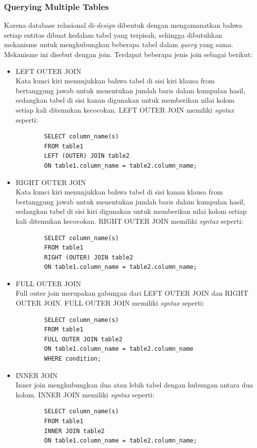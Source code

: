 \subsubsection{Querying Multiple Tables}
Karena database relasional di-\textit{design} dibentuk dengan mengamanatkan bahwa setiap entitas dibuat kedalam tabel yang terpisah, sehingga dibutuhkan mekanisme untuk menghubungkan beberapa tabel dalam \textit{query} yang sama. Mekanisme ini disebut dengan join. Terdapat beberapa jenis join sebagai berikut:
\begin{itemize}
	\item LEFT OUTER JOIN \\
	Kata kunci kiri menunjukkan bahwa tabel di sisi kiri klausa from bertanggung jawab untuk menentukan jumlah baris dalam kumpulan hasil, sedangkan tabel di sisi kanan digunakan untuk memberikan nilai kolom setiap kali ditemukan kecocokan. LEFT OUTER JOIN memiliki \textit{syntax} seperti:
	\begin{verbatim}
		SELECT column_name(s)
		FROM table1
		LEFT (OUTER) JOIN table2
		ON table1.column_name = table2.column_name;
	\end{verbatim}
	
	\item RIGHT OUTER JOIN \\
	Kata kunci kiri menunjukkan bahwa tabel di sisi kanan klausa from bertanggung jawab untuk menentukan jumlah baris dalam kumpulan hasil, sedangkan tabel di sisi kiri digunakan untuk memberikan nilai kolom setiap kali ditemukan kecocokan. RIGHT OUTER JOIN memiliki \textit{syntax} seperti:
	\begin{verbatim}
		SELECT column_name(s)
		FROM table1
		RIGHT (OUTER) JOIN table2
		ON table1.column_name = table2.column_name;
	\end{verbatim}
	
	\item FULL OUTER JOIN \\
	Full outer join merupakan gabungan dari LEFT OUTER JOIN dan RIGHT OUTER JOIN. FULL OUTER JOIN memiliki \textit{syntax} seperti:
	\begin{verbatim}
		SELECT column_name(s)
		FROM table1
		FULL OUTER JOIN table2
		ON table1.column_name = table2.column_name
		WHERE condition;
	\end{verbatim}
	
	\item INNER JOIN \\
	Inner join menghubungkan dua atau lebih tabel dengan hubungan antara dua kolom. INNER JOIN memiliki \textit{syntax} seperti:
	\begin{verbatim}
		SELECT column_name(s)
		FROM table1
		INNER JOIN table2
		ON table1.column_name = table2.column_name;
	\end{verbatim}
\end{itemize}

